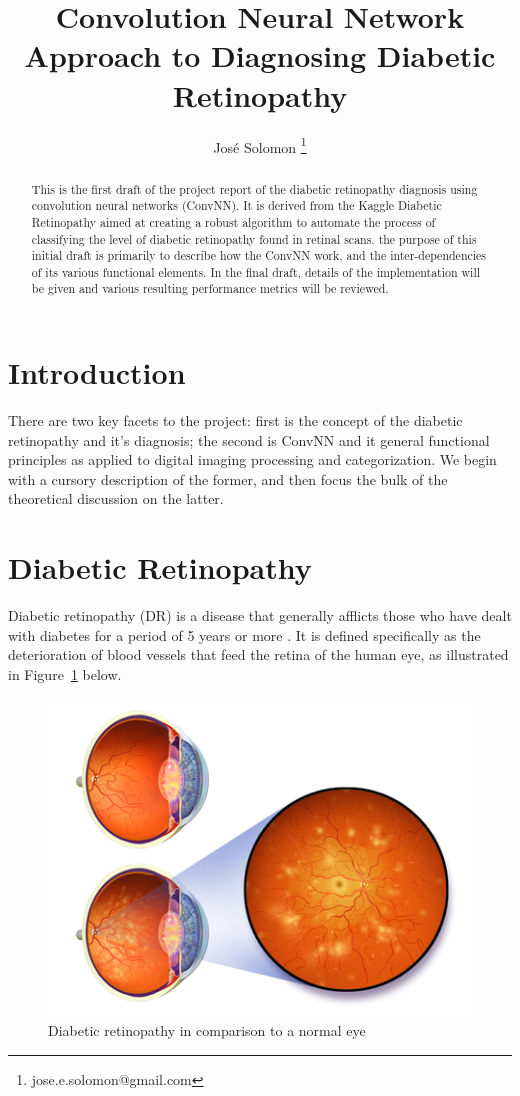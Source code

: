 \documentclass[letterpaper,12pt]{article}
\title{Convolution Neural Network Approach to Diagnosing Diabetic Retinopathy}
\author{Jos\'e Solomon \thanks{jose.e.solomon@gmail.com} }
\date{}
\newcommand{\figref}[1]{Figure~\ref{#1}}
\begin{document}
\maketitle
\begin{abstract}
This is the first draft of the project report of the diabetic retinopathy diagnosis using convolution neural networks (ConvNN). It is derived from the Kaggle Diabetic Retinopathy \cite{kaggle} aimed at creating a robust algorithm to automate the process of classifying the level of diabetic retinopathy found in retinal scans. the purpose of this initial draft is primarily to describe how the ConvNN work, and the inter-dependencies  of its various functional elements. In the final draft, details of the implementation will be given and various resulting performance metrics will be reviewed.
\end{abstract}
\tableofcontents

\section{Introduction}

There are two key facets to the project: first is the concept of the diabetic retinopathy and it's diagnosis; the second is ConvNN and it general functional principles as applied to digital imaging processing and categorization. We begin with a cursory description of the former, and then focus the bulk of the theoretical discussion on the latter.

\section{Diabetic Retinopathy}

Diabetic retinopathy (DR) is a disease that generally afflicts those who have dealt with diabetes for a period of 5 years or more \cite{nih}. It is defined specifically as the deterioration of blood vessels that feed the retina of the human eye, as illustrated in \figref{eye} below.

\begin{figure}[htbp]
\begin{center}
\includegraphics[scale=0.6]{images/illustration.png}
\caption{Diabetic retinopathy in comparison to a normal eye \cite{wiki}}
\label{eye}
\end{center}
\end{figure}
\end{document}
